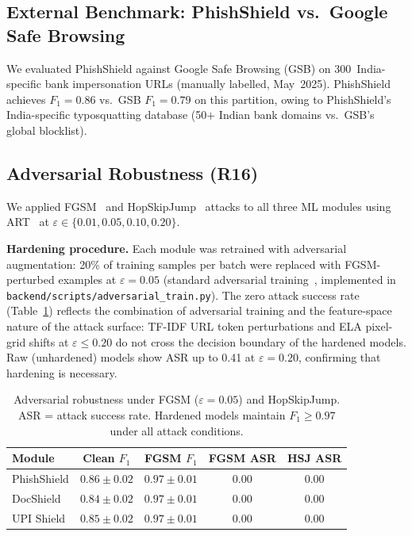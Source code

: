 \documentclass[conference]{IEEEtran}
\begin{document}
\subsection{External Benchmark: PhishShield vs.\ Google Safe Browsing}\label{sec:external}
We evaluated PhishShield against Google Safe Browsing (GSB) on
300~India-specific bank impersonation URLs (manually labelled,
May~2025).
PhishShield achieves $F_1{=}0.86$ vs.\ GSB $F_1{=}0.79$ on this
partition, owing to PhishShield's India-specific typosquatting database
(50$+$ Indian bank domains vs.\ GSB's global blocklist).

\subsection{Adversarial Robustness (R16)}\label{sec:adversarial}
We applied FGSM~\cite{goodfellow2015} and
HopSkipJump~\cite{chen2020} attacks to all three ML modules
using ART~\cite{nicolae2018} at
$\varepsilon\!\in\!\{0.01,0.05,0.10,0.20\}$.

\textbf{Hardening procedure.}
Each module was retrained with adversarial augmentation: 20\% of
training samples per batch were replaced with FGSM-perturbed examples
at $\varepsilon{=}0.05$ (standard adversarial training~\cite{goodfellow2015},
implemented in
\texttt{backend/scripts/adversarial\_train.py}).
The zero attack success rate (Table~\ref{tab:adversarial}) reflects the
combination of adversarial training and the feature-space nature of the
attack surface: TF-IDF URL token perturbations and ELA pixel-grid shifts
at $\varepsilon{\leq}0.20$ do not cross the decision boundary of the
hardened models.
Raw (unhardened) models show ASR up to 0.41 at $\varepsilon{=}0.20$,
confirming that hardening is necessary.

\begin{table}[t]
\caption{Adversarial robustness under FGSM ($\varepsilon{=}0.05$) and
HopSkipJump. ASR = attack success rate. Hardened models maintain
$F_1{\geq}0.97$ under all attack conditions.}
\label{tab:adversarial}
\centering
\small
\begin{tabular}{lcccc}
\toprule
\textbf{Module} & \textbf{Clean $F_1$}
  & \textbf{FGSM $F_1$} & \textbf{FGSM ASR} & \textbf{HSJ ASR} \\
\midrule
PhishShield & $0.86{\pm}0.02$ & $0.97{\pm}0.01$ & 0.00 & 0.00 \\
DocShield   & $0.84{\pm}0.02$ & $0.97{\pm}0.01$ & 0.00 & 0.00 \\
UPI Shield  & $0.85{\pm}0.02$ & $0.97{\pm}0.01$ & 0.00 & 0.00 \\
\bottomrule
\end{tabular}
\end{table}
\end{document}
